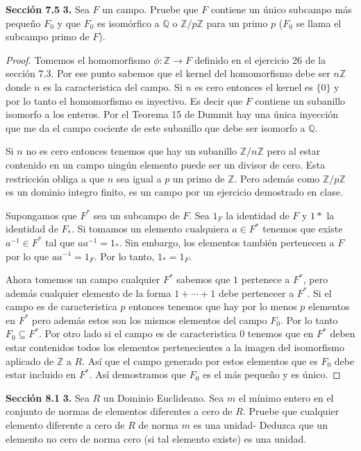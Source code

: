 \documentclass[letter,twoside,12pt]{article}
\begin{document}
\newpage
\textbf{Secci\'on 7.5} \textbf{3.} Sea $F$ un campo. Pruebe que $F$ contiene un \'unico subcampo m\'as peque\~no $F_0$ y que $F_0$ es isom\'orfico a $\mathbb{Q}$ o $\mathbb{Z}/p\mathbb{Z}$ para un primo $p$ ($F_0$ se llama el subcampo primo de $F$).
\begin{proof}
Tomemos el homomorfismo $\phi:\mathbb{Z} \to F$ definido en el ejercicio 26 de la secci\'on 7.3. Por ese punto sabemos que el kernel del homomorfismo debe ser $n\mathbb{Z}$ donde $n$ es la caracteristica del campo. Si $n$ es cero entonces el kernel es $\{0\}$ y por lo tanto el homomorfismo es inyectivo. Es decir que $F$ contiene un subanillo isomorfo a los enteros. Por el Teorema 15 de Dummit hay una \'unica inyecci\'on que me da el campo cociente de este subanillo que debe ser isomorfo a $\mathbb{Q}$.

Si $n$ no es cero entonces tenemos que hay un subanillo $\mathbb{Z}/n\mathbb{Z}$ pero al estar contenido en un campo ning\'un elemento puede ser un divisor de cero. Esta restricci\'on obliga a que $n$ sea igual a $p$ un primo de $\mathbb{Z}$. Pero adem\'as como $\mathbb{Z}/p\mathbb{Z}$ es un dominio integro finito, es un campo por un ejercicio demostrado en clase.

Supongamos que $ F^* $ sea un subcampo de $F$. Sea $1_F$ la identidad de $F$ y $ 1* $ la identidad de $F_*$. Si tomamos un elemento cualquiera $a \in F^*$ tenemos que existe $a^{-1} \in F^*$ tal que $aa^{-1}=1_*$. Sin embargo, los elementos tambi\'en pertenecen a $ F $ por lo que $ aa^{-1}=1_F$. Por lo tanto, $ 1_*=1_F$.

Ahora tomemos un campo cualquier $ F^* $ sabemos que $1$ pertenece a $ F^* $, pero adem\'as cualquier elemento de la forma $1+\cdots +1$ debe pertenecer a $F^*$. Si el campo es de caracteristica $ p $ entonces tenemos que hay por lo menos $ p $ elementos en $ F^* $ pero adem\'as estos son los mismos elementos del campo $ F_0 $. Por lo tanto $ F_0  \subseteq F^*$. Por otro lado si el campo es de caracteristica 0 tenemos que en $F^*$ deben estar contenidos todos los elementos pertenecientes a la imagen del isomorfismo aplicado de $ \mathbb{Z} $ a $ R $. As\'i que el campo generado por estos elementos que es $ F_0 $ debe estar incluido en $ F^{*} $. As\'i demostramos que $ F_0 $ es el m\'as peque\~no y es \'unico.
\end{proof}
\newpage
\textbf{Secci\'on 8.1} \textbf{3.} Sea $R$ un Dominio Euclideano. Sea $m$ el m\'inimo entero en el conjunto de normas de elementos diferentes a cero de $R$. Pruebe que cualquier elemento diferente a cero de $R$ de norma $m$ es una unidad- Deduzca que un elemento no cero de norma cero (si tal elemento existe) es una unidad.
\end{document}
